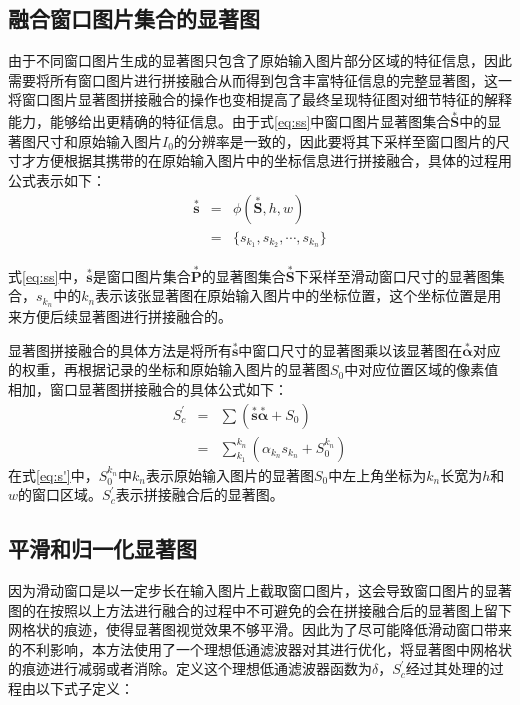 \subsection{融合窗口图片集合的显著图}
由于不同窗口图片生成的显著图只包含了原始输入图片部分区域的特征信息，因此需要将所有窗口图片进行拼接融合从而得到包含丰富特征信息的完整显著图，这一将窗口图片显著图拼接融合的操作也变相提高了最终呈现特征图对细节特征的解释能力，能够给出更精确的特征信息。由于式\ref{eq:ss}中窗口图片显著图集合$\overset{*}{\bm{S}}$中的显著图尺寸和原始输入图片$I_0$的分辨率是一致的，因此要将其下采样至窗口图片的尺寸才方便根据其携带的在原始输入图片中的坐标信息进行拼接融合，具体的过程用公式表示如下：
\begin{eqnarray}
	\overset{*}{\bm{s}} &=& \phi(\overset{*}{\bm{S}},h,w) \nonumber \\
	~ &=& \{s_{k_1},s_{k_2},\cdots,s_{k_n}\}
\label{eq:ss}
\end{eqnarray}

式\ref{eq:ss}中，$\overset{*}{\bm{s}}$是窗口图片集合$\overset{*}{\bm{P}}$的显著图集合$\overset{*}{\bm{S}}$下采样至滑动窗口尺寸的显著图集合，$s_{k_n}$中的$k_n$表示该张显著图在原始输入图片中的坐标位置，这个坐标位置是用来方便后续显著图进行拼接融合的。

显著图拼接融合的具体方法是将所有$\overset{*}{\bm{s}}$中窗口尺寸的显著图乘以该显著图在$\overset{*}{\bm{\alpha}}$对应的权重，再根据记录的坐标和原始输入图片的显著图$S_0$中对应位置区域的像素值相加，窗口显著图拼接融合的具体公式如下：
\begin{eqnarray}
	S^{\prime}_c &=& \sum(\overset{*}{\bm{s}}\overset{*}{\bm{\alpha}}+S_0) \nonumber \\
	~ &=& \sum_{k_1}^{k_n}(\alpha_{k_n}s_{k_n}+S_0^{k_n})
	\label{eq:s'}
\end{eqnarray}
在式\ref{eq:s'}中，$S_0^{k_n}$中$k_n$表示原始输入图片的显著图$S_0$中左上角坐标为$k_n$长宽为$h$和$w$的窗口区域。$S^{\prime}_c$表示拼接融合后的显著图。

\subsection{平滑和归一化显著图}
因为滑动窗口是以一定步长在输入图片上截取窗口图片，这会导致窗口图片的显著图的在按照以上方法进行融合的过程中不可避免的会在拼接融合后的显著图上留下网格状的痕迹，使得显著图视觉效果不够平滑。因此为了尽可能降低滑动窗口带来的不利影响，本方法使用了一个理想低通滤波器对其进行优化，将显著图中网格状的痕迹进行减弱或者消除。定义这个理想低通滤波器函数为$\delta$，$S^{\prime}_c$经过其处理的过程由以下式子定义：

